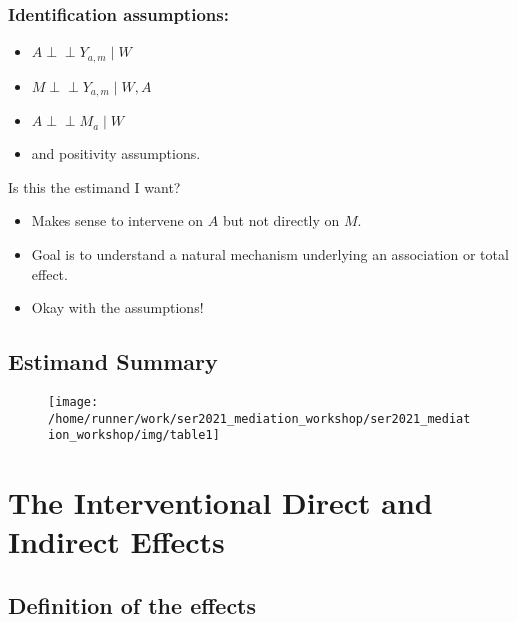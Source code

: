 \documentclass[
  12pt, krantz2,
]{book}
\providecommand{\tightlist}{%
  \setlength{\itemsep}{0pt}\setlength{\parskip}{0pt}}
\theoremstyle{definition}
\theoremstyle{definition}
\theoremstyle{definition}
\newcommand{\indep}{\mbox{$\perp\!\!\!\perp$}}
\newcommand{\1}{\mathbbm{1}}
\begin{document}
\hypertarget{identification-assumptions-1}{%
\subsection{Identification assumptions:}\label{identification-assumptions-1}}

\begin{itemize}
\tightlist
\item
  \(A \indep Y_{a,m} \mid W\)
\item
  \(M \indep Y_{a,m} \mid W, A\)
\item
  \(A \indep M_a \mid W\)
\item
  and positivity assumptions.
\end{itemize}

Is this the estimand I want?

\begin{itemize}
\tightlist
\item
  Makes sense to intervene on \(A\) but not directly on \(M\).
\item
  Goal is to understand a natural mechanism underlying an association or total
  effect.
\item
  Okay with the assumptions!
\end{itemize}

\hypertarget{estimand-summary}{%
\section*{Estimand Summary}\label{estimand-summary}}


\begin{figure}

{\centering \texttt{[image: /home/runner/work/ser2021\_mediation\_workshop/ser2021\_mediation\_workshop/img/table1]} 

}

\end{figure}

\hypertarget{interventional}{%
\chapter{The Interventional Direct and Indirect Effects}\label{interventional}}

\hypertarget{definition-of-the-effects}{%
\section{Definition of the effects}\label{definition-of-the-effects}}
\end{document}
